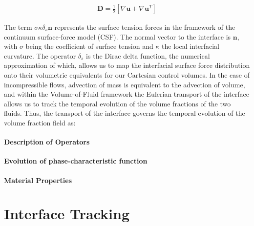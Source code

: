 \begin{align}
	\boldsymbol{D} = \frac{1}{2}\left[\nabla \boldsymbol{u} + \nabla \boldsymbol{u}^{T}\right]  
\end{align}


The term $\sigma \kappa \delta_{s}\boldsymbol{n}$ represents the surface tension forces in the framework of the continuum surface-force model (CSF). The normal vector to the interface is $\boldsymbol{n}$, with $\sigma$ being the coefficient of surface tension and $\kappa$ the local interfacial curvature. The operator $\delta_{s}$ is the Dirac delta function, the numerical approximation of which, allows us to map the interfacial surface force distribution onto their volumetric equivalents for our Cartesian control volumes. In the case of incompressible flows, advection of mass is equivalent to the advection of volume, and within the Volume-of-Fluid framework the Eulerian transport of the interface allows us to track the temporal evolution of the volume fractions of the two fluids. Thus, the transport of the interface governs the temporal evolution of the volume fraction field as: 



\paragraph{Description of Operators}
\blindtext




\paragraph{Evolution of phase-characteristic function}
\blindtext



\paragraph{Material Properties}
\blindtext



\section{Interface Tracking}

